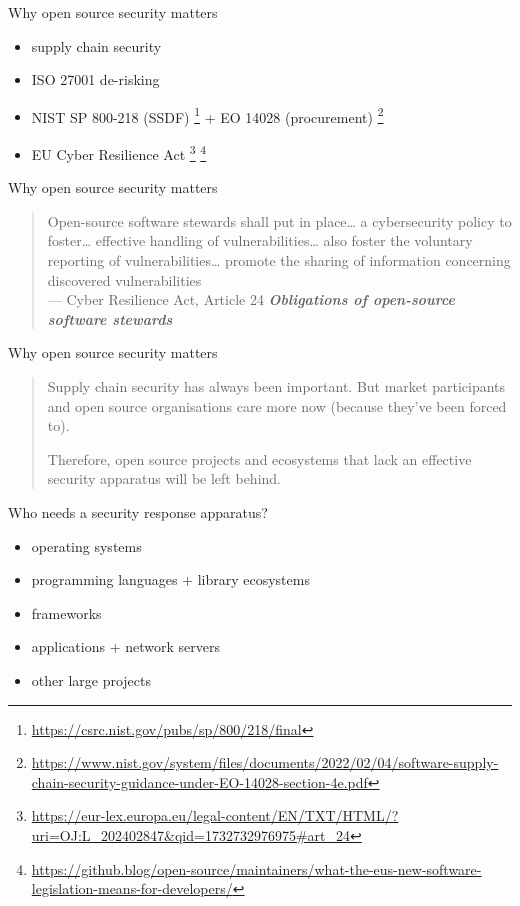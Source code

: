 \documentclass[ignorenonframetext,aspectratio=169,12pt]{beamer}
\begin{document}
\begin{frame}{Why open source security matters}
    \begin{itemize}
        \item supply chain security
        \item ISO 27001 de-risking
        \item NIST SP 800-218 (SSDF)
            \footnote{\url{https://csrc.nist.gov/pubs/sp/800/218/final}}
            + EO 14028 (procurement)
            \footnote{\url{https://www.nist.gov/system/files/documents/2022/02/04/software-supply-chain-security-guidance-under-EO-14028-section-4e.pdf}}
        \item EU Cyber Resilience Act
            \footnote{\url{https://eur-lex.europa.eu/legal-content/EN/TXT/HTML/?uri=OJ:L_202402847&qid=1732732976975\#art_24}}
            \footnote{\url{https://github.blog/open-source/maintainers/what-the-eus-new-software-legislation-means-for-developers/}}
    \end{itemize}
\end{frame}

\begin{frame}{Why open source security matters}
\begin{quote}
\raggedright
  Open-source software {stewards} shall put in place\ldots{}
  a {cybersecurity policy} to foster\ldots{}
  effective {handling of vulnerabilities}\ldots{}
  also foster the {voluntary reporting} of vulnerabilities\ldots{}
  promote the {sharing of information} concerning discovered vulnerabilities
\\
  {\hfill --- \footnotesize Cyber Resilience Act, Article 24 {\em
  \textbf{Obligations of open-source software stewards}}}
\end{quote}
\end{frame}

\begin{frame}{Why open source security matters}
\large
\begin{quote}
\raggedright
Supply chain security has always been important.  But market
  participants and open source organisations care more now (because
  they've been forced to).

\bigskip

Therefore, open source projects and ecosystems that lack an
effective security apparatus will be left behind.
\end{quote}
\end{frame}

\begin{frame}{Who needs a security response apparatus?}
    \begin{itemize}
        \item operating systems
        \item programming languages + library ecosystems
        \item frameworks
        \item applications + network servers
        \item other large projects
    \end{itemize}
\end{frame}
\end{document}
